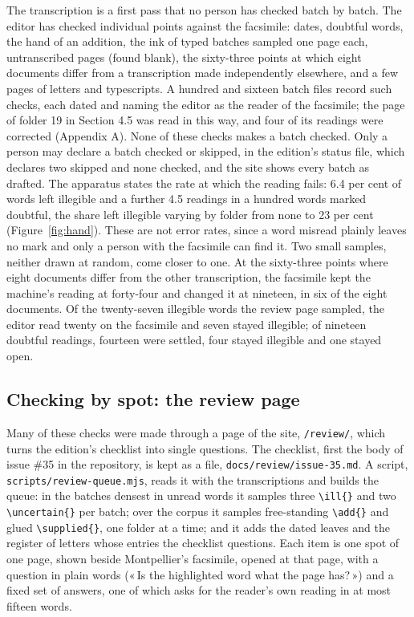 \documentclass[11pt]{article}
\newcommand{\q}[1]{«\,#1\,»}
\begin{document}
The transcription is a first pass that no person has checked batch by batch. The editor has checked individual points against the facsimile: dates, doubtful words, the hand of an addition, the ink of typed batches sampled one page each, untranscribed pages (found blank), the sixty-three points at which eight documents differ from a transcription made independently elsewhere, and a few pages of letters and typescripts. A hundred and sixteen batch files record such checks, each dated and naming the editor as the reader of the facsimile; the page of folder 19 in Section 4.5 was read in this way, and four of its readings were corrected (Appendix A). None of these checks makes a batch checked. Only a person may declare a batch checked or skipped, in the edition's status file, which declares two skipped and none checked, and the site shows every batch as drafted. The apparatus states the rate at which the reading fails: 6.4 per cent of words left illegible and a further 4.5 readings in a hundred words marked doubtful, the share left illegible varying by folder from none to 23 per cent (Figure~\ref{fig:hand}). These are not error rates, since a word misread plainly leaves no mark and only a person with the facsimile can find it. Two small samples, neither drawn at random, come closer to one. At the sixty-three points where eight documents differ from the other transcription, the facsimile kept the machine's reading at forty-four and changed it at nineteen, in six of the eight documents. Of the twenty-seven illegible words the review page sampled, the editor read twenty on the facsimile and seven stayed illegible; of nineteen doubtful readings, fourteen were settled, four stayed illegible and one stayed open.

\subsection{Checking by spot: the review page}

Many of these checks were made through a page of the site, \texttt{/review/}, which turns the edition's checklist into single questions. The checklist, first the body of issue \#35 in the repository, is kept as a file, \texttt{docs/review/issue-35.md}. A script, \texttt{scripts/review-queue.mjs}, reads it with the transcriptions and builds the queue: in the batches densest in unread words it samples three \texttt{\textbackslash ill\{\}} and two \texttt{\textbackslash uncertain\{\}} per batch; over the corpus it samples free-standing \texttt{\textbackslash add\{\}} and glued \texttt{\textbackslash supplied\{\}}, one folder at a time; and it adds the dated leaves and the register of letters whose entries the checklist questions. Each item is one spot of one page, shown beside Montpellier's facsimile, opened at that page, with a question in plain words (\q{Is the highlighted word what the page has?}) and a fixed set of answers, one of which asks for the reader's own reading in at most fifteen words.
\end{document}
